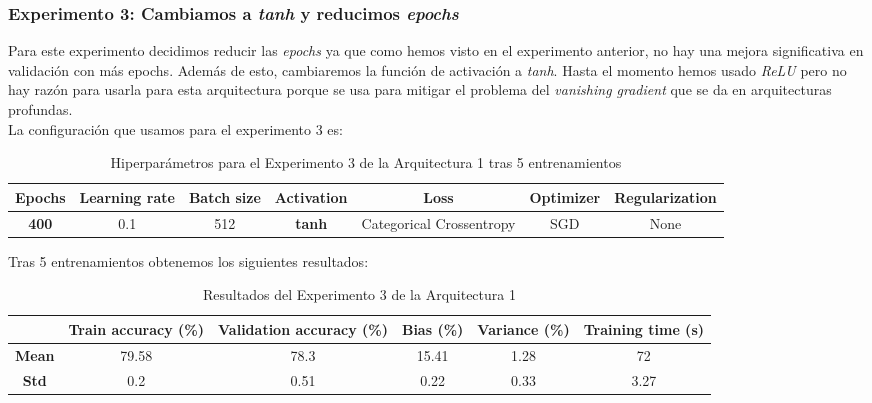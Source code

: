 \documentclass{article}
\begin{document}
		\subsubsection{Experimento 3: Cambiamos a \textit{tanh} y reducimos \textit{epochs}}
		\label{d-s-a1-e3}
			Para este experimento decidimos reducir las \textit{epochs} ya que como hemos visto en el experimento anterior, no hay una mejora significativa en validaci\'on con m\'as epochs. Adem\'as de esto, cambiaremos la funci\'on de activaci\'on a \textit{tanh}. Hasta el momento hemos usado \textit{ReLU} pero no hay raz\'on para usarla para esta arquitectura porque se usa para mitigar el problema del \textit{vanishing gradient} que se da en arquitecturas profundas.\\
			La configuraci\'on que usamos para el experimento 3 es:
			\begin{table}[!h]
				\begin{center}
					\begin{tabular}{| c | c | c | c | c | c | c |}
						\textbf{Epochs} & \textbf{Learning rate} & \textbf{Batch size} & \textbf{Activation} & \textbf{Loss} & \textbf{Optimizer} & \textbf{Regularization} \\ \hline
						\textbf{400} & 0.1 & 512 & \textbf{tanh} & Categorical Crossentropy & SGD & None
					\end{tabular}
					\caption{Hiperpar\'ametros para el Experimento 3 de la Arquitectura 1 tras 5 entrenamientos}
					\label{tab:hip-d-a1-e3}
				\end{center}
			\end{table}
			
			Tras 5 entrenamientos obtenemos los siguientes resultados:
			\begin{table}[!h]
				\begin{center}
					\begin{tabular}{ c | c | c | c | c | c |}
						\ & \textbf{Train accuracy (\%)} & \textbf{Validation accuracy (\%)} & \textbf{Bias (\%)} & \textbf{Variance (\%)} & \textbf{Training time (s)} \\ \hline
						\textbf{Mean} & 79.58 & 78.3 & 15.41 & 1.28 & 72\\ \hline
						\textbf{Std} & 0.2 & 0.51 & 0.22 & 0.33 & 3.27 \\ \hline
					\end{tabular}
					\caption{Resultados del Experimento 3 de la Arquitectura 1}
					\label{tab:res-d-a1-e3}
				\end{center}
			\end{table}
			
\end{document}
